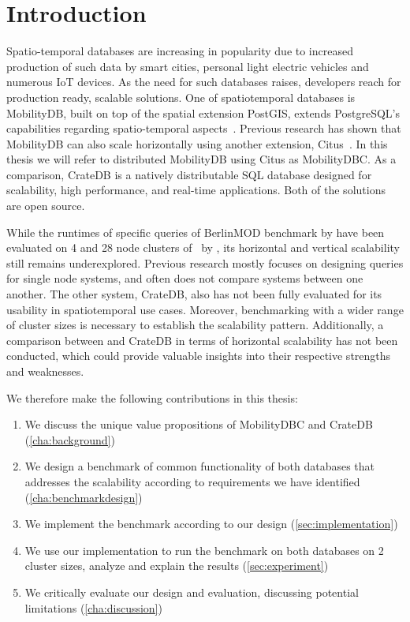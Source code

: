 \section{Introduction}
\label{cha:introduction}

Spatio-temporal databases are increasing in popularity due to increased production of such data by smart cities, personal light electric vehicles and numerous IoT devices.
As the need for such databases raises, developers reach for production ready, scalable solutions.
One of spatiotemporal databases is MobilityDB, built on top of the spatial extension PostGIS, extends PostgreSQL's capabilities regarding spatio-temporal aspects~\parencite{zimanyiMobilityDBMobilityDatabase2020}.
Previous research has shown that MobilityDB can also scale horizontally using another extension, Citus~\parencite{bakliDistributedMobilityData2020, bakliDistributedMovingObject2019, cubukcuCitusDistributedPostgreSQL2021}.
In this thesis we will refer to distributed MobilityDB using Citus as MobilityDBC.
As a comparison, CrateDB is a natively distributable SQL database designed for scalability, high performance, and real-time applications.
Both of the solutions are open source.

While the runtimes of specific queries of BerlinMOD benchmark by \textcite{duntgenBerlinMODBenchmarkMoving2009} have been evaluated on 4 and 28 node clusters of \mobilitydbc~by \parencite{bakliDistributedMobilityData2020}, its horizontal and vertical scalability still remains underexplored.
Previous research mostly focuses on designing queries for single node systems, and often does not compare systems between one another.
The other system, CrateDB, also has not been fully evaluated for its usability in spatiotemporal use cases.
Moreover, benchmarking with a wider range of cluster sizes is necessary to establish the scalability pattern.
Additionally, a comparison between \mobilitydbc and CrateDB in terms of horizontal scalability has not been conducted, which could provide valuable insights into their respective strengths and weaknesses.

We therefore make the following contributions in this thesis:
\begin{enumerate}
	\item We discuss the unique value propositions of MobilityDBC and CrateDB (\cref{cha:background})
	\item We design a benchmark of common functionality of both databases that addresses the scalability according to requirements we have identified (\cref{cha:benchmarkdesign})
	\item We implement the benchmark according to our design (\cref{sec:implementation})
	\item We use our implementation to run the benchmark on both databases on 2 cluster sizes, analyze and explain the results (\cref{sec:experiment})
	\item We critically evaluate our design and evaluation, discussing potential limitations (\cref{cha:discussion})
\end{enumerate}
